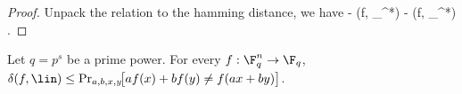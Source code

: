 \begin{proof}
    Unpack the relation to the hamming distance, we have
     -  \delta(f, \ell_{\beta^*})  - \epsilon \implies \delta(f, \ell_{\beta^*}) \le {}\epsilon.
    \ee

\end{proof}




\begin{lemma}
\label{BLR_via_GH}
\leanok
Let $q=p^s$ be a prime power. For every $f : \F_q^n \to \F_q$, $\delta(f, \lin) \le \Pr_{a,b,x,y}\!\bigl[af(x) + bf(y) \ne f(ax + by)\bigr]$.
\end{lemma}

